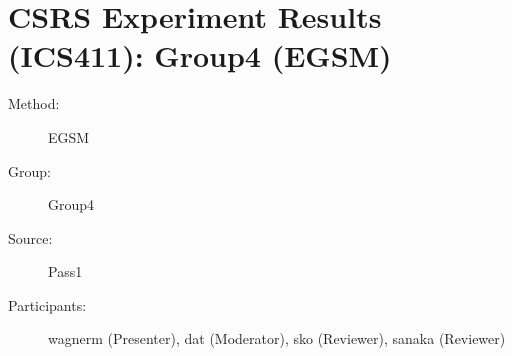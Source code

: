 \chapter {CSRS Experiment Results (ICS411): Group4 (EGSM)}
\small

\begin{description}
\item [Method:] EGSM
\item [Group:] Group4
\item [Source:] Pass1
\item [Participants:] wagnerm (Presenter), dat (Moderator), sko (Reviewer), sanaka (Reviewer)
\end{description}
